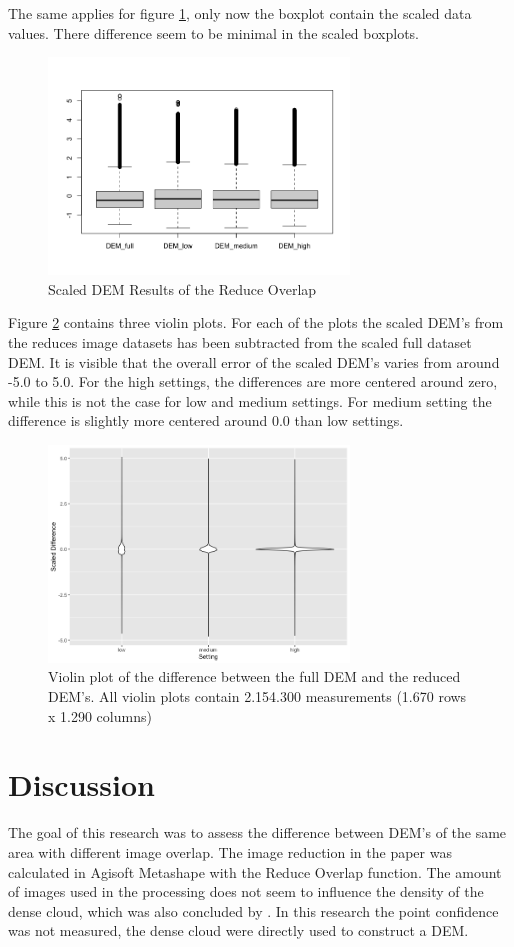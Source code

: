 \documentclass{isprs} %
\begin{document}
The same applies for figure \ref{fig:BoxPlot_scaled}, only now the boxplot contain the scaled data values.
There difference seem to be minimal in the scaled boxplots.

\begin{figure}[h]
    \centering
    \includegraphics[width=8cm]{DemBoxPlot_Scaled.png}
    \caption{Scaled DEM Results of the Reduce Overlap}
    \label{fig:BoxPlot_scaled}
\end{figure}

Figure \ref{fig:ViolinPlot} contains three violin plots. For each of the plots the scaled DEM's from the reduces image datasets has been subtracted from the scaled full dataset DEM.
It is visible that the overall error of the scaled DEM's varies from around -5.0 to 5.0.
For the high settings, the differences are more centered around zero, while this is not the case for low and medium settings.
For medium setting the difference is slightly more centered around 0.0 than low settings.

\begin{figure}[h]
    \centering
    \includegraphics[width=8cm]{ViolinPlotOrdered.png}
    \caption{Violin plot of the difference between the full DEM and the reduced DEM's. All violin plots contain 2.154.300 measurements (1.670 rows x 1.290 columns)}
    \label{fig:ViolinPlot}
\end{figure}


\section{Discussion}
The goal of this research was to assess the difference between DEM's of the same area with different image overlap. 
The image reduction in the paper was calculated in Agisoft Metashape with the Reduce Overlap function.
The amount of images used in the processing does not seem to influence the density of the dense cloud, which was also concluded by \citet{EffectofUABimgcamover}.
In this research the point confidence was not measured, the dense cloud were directly used to construct a DEM. 
\end{document}
